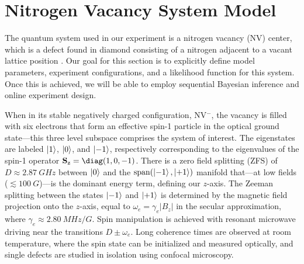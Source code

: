 \documentclass[aps,nofootinbib,twocolumn,superscriptaddress]{revtex4}
\begin{document}
\section{Nitrogen Vacancy System Model}
\label{sec:system-model}

The quantum system used in our experiment is a nitrogen vacancy (NV) center,
which is a defect found in diamond consisting of a nitrogen adjacent to
a vacant lattice position \cite{doherty_nitrogenvacancy_2013}.
Our goal for this section is to explicitly define model parameters, experiment
configurations, and a likelihood function for this system.
Once this is achieved, we will be able to employ sequential
Bayesian inference and online experiment design.

When in its stable negatively charged configuration, NV$^-$,
the vacancy is filled with
six electrons that form an effective spin-1 particle in the optical
ground state---this three level subspace comprises the system of interest.
The eigenstates are labeled $\ket{1}$, $\ket{0}$, and $\ket{-1}$, respectively
corresponding to the eigenvalues of the spin-1 operator $\Sz=\diag(1,0,-1)$.
There is a zero field splitting (ZFS) of $D\approx\SI{2.87}{GHz}$
between $\ket{0}$ and the $\operatorname{span}(\ket{-1},\ket{+1})$ manifold
that---at low fields ($\lesssim\SI{100}{G}$)---is the dominant energy term,
defining our $z$-axis.
The Zeeman splitting between the states $\ket{-1}$ and $\ket{+1}$
is determined by the magnetic field projection onto the $z$-axis, equal to
$\omega_e=\gamma_e |B_z|$ in the secular approximation,
where $\gamma_e\approx\SI{2.80}{MHz/G}$.
Spin manipulation is achieved with resonant microwave driving near
the transitions $D\pm\omega_e$.
Long coherence times are observed at room temperature, where
the spin state can be initialized and measured optically, and single
defects are studied in isolation using confocal microscopy.
\end{document}
